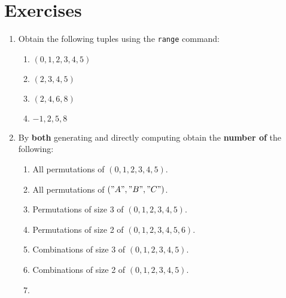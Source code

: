 \section{Exercises}
\begin{enumerate}

\item 

Obtain the following tuples using the \texttt{range} command:
\begin{enumerate}

\item 

\((0, 1, 2, 3, 4, 5)\)

\item 

\((2, 3, 4, 5)\)

\item 

\((2, 4, 6, 8)\)

\item 

\(-1, 2, 5, 8\)

\end{enumerate}

\item 

By \textbf{both} generating and directly computing obtain the \textbf{number of} the following:
\begin{enumerate}

\item 

All permutations of \((0, 1, 2, 3, 4, 5)\).

\item 

All permutations of \(("A", "B", "C")\).

\item 

Permutations of size 3 of \((0, 1, 2, 3, 4, 5)\).

\item 

Permutations of size 2 of \((0, 1, 2, 3, 4, 5, 6)\).

\item 

Combinations of size 3 of \((0, 1, 2, 3, 4, 5)\).

\item 

Combinations of size 2 of \((0, 1, 2, 3, 4, 5)\).

\item 


\end{enumerate}
\end{enumerate}

